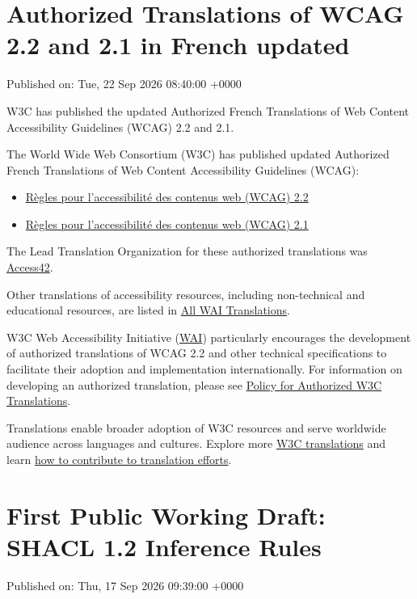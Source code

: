 \documentclass[11pt,a4paper]{article}
\begin{document}
\section{Authorized Translations of WCAG 2.2 and 2.1 in French updated}

Published on: Tue, 22 Sep 2026 08:40:00 +0000

W3C has published the updated Authorized French Translations of Web Content Accessibility Guidelines (WCAG) 2.2 and 2.1.

The World Wide Web Consortium (W3C) has published updated Authorized French Translations of Web Content Accessibility Guidelines (WCAG):

\begin{itemize}
\item \href{https://www.w3.org/Translations/WCAG22-fr-20260922/}{Règles pour l'accessibilité des contenus web (WCAG) 2.2}
\item \href{https://www.w3.org/Translations/WCAG21-fr-20260922/}{Règles pour l'accessibilité des contenus web (WCAG) 2.1}
\end{itemize}

The Lead Translation Organization for these authorized translations was \href{https://access42.net/}{Access42}.

Other translations of accessibility resources, including non-technical and educational resources, are listed in \href{https://www.w3.org/WAI/translations/}{All WAI Translations}.

W3C Web Accessibility Initiative (\href{https://www.w3.org/WAI/}{WAI}) particularly encourages the development of authorized translations of WCAG 2.2 and other technical specifications to facilitate their adoption and implementation internationally. For information on developing an authorized translation, please see \href{https://www.w3.org/2005/02/TranslationPolicy}{Policy for Authorized W3C Translations}.

Translations enable broader adoption of W3C resources and serve worldwide audience across languages and cultures. Explore more \href{https://www.w3.org/Translations/}{W3C translations} and learn \href{https://www.w3.org/Consortium/Translation/}{how to contribute to translation efforts}.

\section{First Public Working Draft: SHACL 1.2 Inference Rules}

Published on: Thu, 17 Sep 2026 09:39:00 +0000
\end{document}
